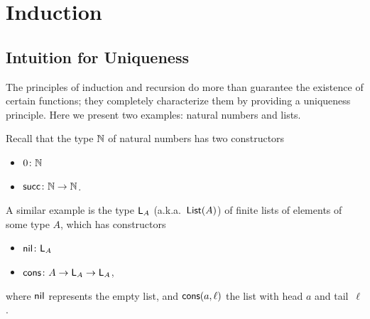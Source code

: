 \chapter{Induction}

\section{Intuition for Uniqueness}\label{intuition-for-uniqueness}

The principles of induction and recursion do more than guarantee the existence of certain functions; they completely characterize them by providing a uniqueness principle. Here we present two examples: natural numbers and lists.

Recall that the type $\mathbb{N}$ of natural numbers has two constructors
\begin{itemize}
    \item $0\colon\N$
    \item $\fun{succ}\colon\N\to\N$.
\end{itemize}
A similar example is the type $\mathsf{L}_A$ (a.k.a.~$\mathsf{List}(A)$) of finite lists of elements of some type $A$, which has constructors
\begin{itemize}
    \item $\fun{nil}\colon\fun L_A$
    \item $\fun{cons}\colon A\to\fun L_A\to\fun L_A$,
\end{itemize}
where $\mathsf{nil}$ represents the empty list, and $\mathsf{cons}(a,\ell)$ the list with head $a$ and tail~$\ell$.

